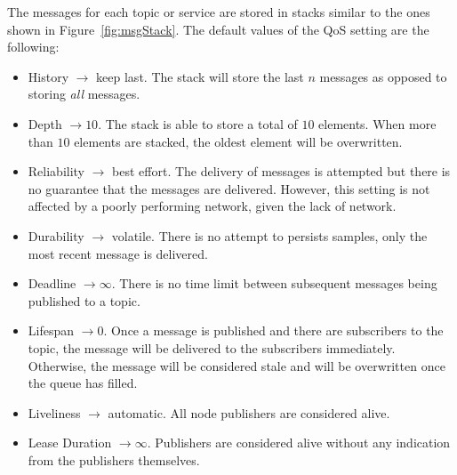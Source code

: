     The messages for each topic or service are stored in stacks similar to the ones shown in Figure~\ref{fig:msgStack}. The default values of the \ac{QoS} setting are the following:

    \begin{itemize}
        \item History $\rightarrow$ keep last. The stack will store the last $n$ messages as opposed to storing \textit{all} messages.
        \item Depth $\rightarrow 10$. The stack is able to store a total of $10$ elements. When more than $10$ elements are stacked, the oldest element will be overwritten.
        \item Reliability $\rightarrow$ best effort. The delivery of messages is attempted but there is no guarantee that the messages are delivered. However, this setting is not affected by a poorly performing network, given the lack of network.
        \item Durability $\rightarrow$ volatile. There is no attempt to persists samples, only the most recent message is delivered.
        \item Deadline $\rightarrow \infty$. There is no time limit between subsequent messages being published to a topic.
        \item Lifespan $\rightarrow 0$. Once a message is published and there are subscribers to the topic, the message will be delivered to the subscribers immediately. Otherwise, the message will be considered stale and will be overwritten once the queue has filled. 
        \item Liveliness $\rightarrow$ automatic. All node publishers are considered alive.
        \item Lease Duration $\rightarrow \infty$. Publishers are considered alive without any indication from the publishers themselves. 
    \end{itemize}

